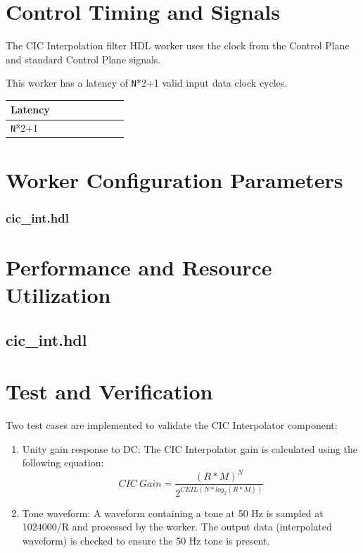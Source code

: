 \documentclass{article}
\def\comp{cic\_int}
\edef\ecomp{cic_int}
\begin{document}
\section*{Control Timing and Signals}
\begin{flushleft}
	The CIC Interpolation filter HDL worker uses the clock from the Control Plane and standard Control Plane signals.\medskip


	This worker has a latency of \verb+N+*2+1 valid input data clock cycles.\medskip

	\begin{tabular}{|M{4.5cm}|M{4.5cm}|M{1cm}|M{1.5cm}|M{2cm}|M{1cm}|M{1cm}|M{2.5cm}|}
		\hline
		\hline
		Latency         \\
		\hline
		\verb+N+*2+1    \\
		\hline
	\end{tabular}
\end{flushleft}

\begin{landscape}
\section*{Worker Configuration Parameters}
\subsubsection*{\comp.hdl}

\section*{Performance and Resource Utilization}
\subsection*{\comp.hdl}

\end{landscape}
\newpage
\section*{Test and Verification}
Two test cases are implemented to validate the CIC Interpolator component:

\begin{enumerate}
	\item Unity gain response to DC: The CIC Interpolator gain is calculated using the following equation:
	      \begin{equation} \label{eq:cic_gain}
	      	CIC\ Gain = \frac{(R*M)^N}{2^{CEIL(N*log_2(R*M))}}
	      \end{equation}
	\item Tone waveform: A waveform containing a tone at 50 Hz is sampled at 1024000/R and processed by the worker. The output data (interpolated waveform) is checked to ensure the 50 Hz tone is present.
\end{enumerate}\medskip
\end{document}
